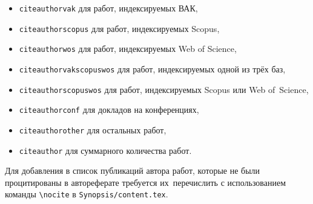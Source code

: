 \begin{itemize}
        \item \texttt{citeauthorvak} для работ, индексируемых ВАК,
        \item \texttt{citeauthorscopus} для работ, индексируемых Scopus,
        \item \texttt{citeauthorwos} для работ, индексируемых Web of Science,
        \item \texttt{citeauthorvakscopuswos} для работ, индексируемых одной из трёх баз,
        \item \texttt{citeauthorscopuswos} для работ, индексируемых Scopus или Web of~Science,
        \item \texttt{citeauthorconf} для докладов на конференциях,
        \item \texttt{citeauthorother} для остальных работ,
        \item \texttt{citeauthor} для суммарного количества работ.
\end{itemize}

Для добавления в список публикаций автора работ, которые не были процитированы в
автореферате требуется их~перечислить с использованием команды \verb!\nocite! в
\verb!Synopsis/content.tex!.
\fi
